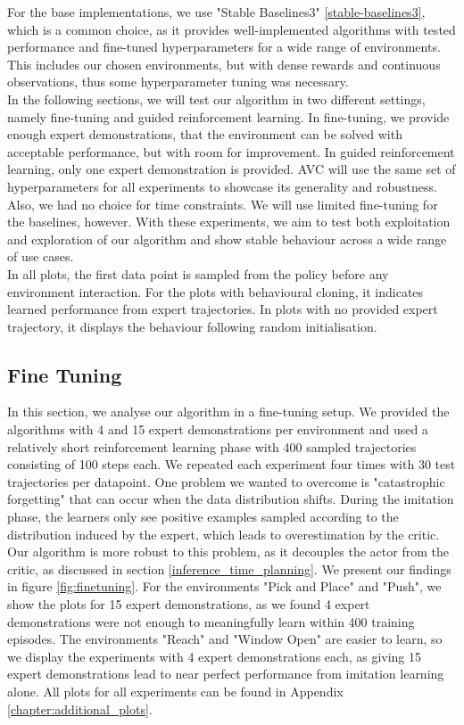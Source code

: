 For the base implementations, we use "Stable Baselines3" \ref{stable-baselines3}, which is a common choice, as it provides well-implemented algorithms with tested
performance and fine-tuned hyperparameters for a wide range of environments. This includes our chosen environments, but with dense rewards and continuous observations,
thus some hyperparameter tuning was necessary. \\

In the following sections, we will test our algorithm in two different settings, namely fine-tuning and guided reinforcement learning. In fine-tuning, we provide
enough expert demonstrations, that the environment can be solved with acceptable performance, but with room for improvement. In guided reinforcement learning,
only one expert demonstration is provided. AVC will use the same set of hyperparameters for all experiments to showcase its generality and robustness. Also, we had no choice for time constraints.
We will use limited fine-tuning for the baselines, however.
With these experiments, we aim to test both exploitation and exploration of our algorithm and show stable
behaviour across a wide range of use cases. \\

In all plots, the first data point is sampled from the policy before any environment interaction. For the plots with behavioural cloning, it indicates learned performance from expert trajectories.
In plots with no provided expert trajectory, it displays the behaviour following random initialisation.


\subsection{Fine Tuning}
\label{sec:fine_tuning}
In this section, we analyse our algorithm in a fine-tuning setup. We provided the algorithms with 4 and 15 expert demonstrations per 
environment and used a relatively short reinforcement learning phase with 400 sampled trajectories consisting of 100 steps each. We 
repeated each experiment four times with 30 test trajectories per datapoint. One problem we wanted to overcome is "catastrophic forgetting" 
that can occur when the data distribution shifts. During the imitation phase, the learners only see positive examples sampled according to 
the distribution induced by the expert, which leads to overestimation by the critic. Our algorithm is more robust to this problem, as it 
decouples the actor from the critic, as discussed in section \ref{inference_time_planning}. We present our findings in figure \ref{fig:finetuning}. 
For the environments "Pick and Place" and "Push", we show the plots for 15 expert demonstrations, as we found 4 expert demonstrations were not 
enough to meaningfully learn within 400 training episodes. The environments "Reach" and "Window Open" are easier to learn, so we display the 
experiments with 4 expert demonstrations each, as giving 15 expert demonstrations lead to near perfect performance from imitation learning alone. 
All plots for all experiments can be found in Appendix \ref{chapter:additional_plots}.\\

